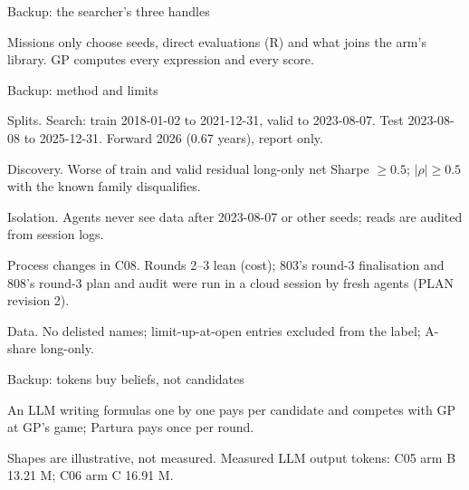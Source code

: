 \documentclass[t,20pt]{beamer}
\newcommand\notesize{\fontsize{14}{17}\selectfont\hyphenpenalty=10000\exhyphenpenalty=10000}
\newcommand\lead[1]{{\mediumfont #1}}
\newenvironment{blist}{%
  \begin{list}{\textcolor{sec}{\textbullet}}{\def\makelabel##1{##1\hfil}%
    \setlength\leftmargin{0.34in}\setlength\labelwidth{0.2in}\setlength\labelsep{0.14in}%
    \setlength\itemsep{16pt}\setlength\parsep{0pt}\setlength\topsep{0pt}\setlength\partopsep{0pt}%
    \setlength\itemindent{0pt}\setlength\listparindent{0pt}\setlength\rightmargin{0pt}}}%
  {\end{list}}
\newcounter{nl}
\newcommand\gap[1]{\par\vspace{#1}}
\newcommand\textfirst{\vspace*{-0.14in}}
\newcommand\fig[1]{\par\noindent\makebox[\textwidth][l]{}\par}
\newcommand\body[1]{{\fontsize{18}{22}\selectfont#1}}
\newcommand\src[1]{\par\vfill{\notesize\color{sec}#1\par}\vspace{0.02in}}
\begin{document}
\begin{frame}{Backup: the searcher's three handles}
\fig{figs_final/searcher.tex}
\gap{0.16in}
\body{Missions only choose seeds, direct evaluations (R) and what joins the arm's library. \lead{GP computes every expression and every score.}}
\end{frame}

\begin{frame}{Backup: method and limits}
\textfirst
\begin{blist}\setlength\itemsep{14pt}
  \item \lead{Splits.} Search: train 2018-01-02 to 2021-12-31, valid to 2023-08-07. Test 2023-08-08 to 2025-12-31. Forward 2026 (0.67 years), report only.
  \item \lead{Discovery.} Worse of train and valid residual long-only net Sharpe $\ge 0.5$; $|\rho| \ge 0.5$ with the known family disqualifies.
  \item \lead{Isolation.} Agents never see data after 2023-08-07 or other seeds; reads are audited from session logs.
  \item \lead{Process changes in C08.} Rounds 2–3 lean (cost); 803's round-3 finalisation and 808's round-3 plan and audit were run in a cloud session by fresh agents (PLAN revision 2).
  \item \lead{Data.} No delisted names; limit-up-at-open entries excluded from the label; A-share long-only.
\end{blist}
\end{frame}

\begin{frame}{Backup: tokens buy beliefs, not candidates}
\textfirst
\fig{figs_final/cost.tex}
\gap{0.10in}
\body{An LLM writing formulas one by one pays per candidate and competes with GP at GP's game; Partura pays once per round.}
\src{Shapes are illustrative, not measured. Measured LLM output tokens: C05 arm B 13.21 M; C06 arm C 16.91 M.}
\end{frame}
\end{document}
